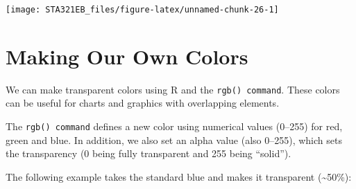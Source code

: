 \documentclass[
]{book}
\newenvironment{Shaded}{\begin{snugshade}}{\end{snugshade}}
\newcommand{\AttributeTok}[1]{\textcolor[rgb]{0.13,0.29,0.53}{#1}}
\newcommand{\ConstantTok}[1]{\textcolor[rgb]{0.56,0.35,0.01}{#1}}
\newcommand{\DecValTok}[1]{\textcolor[rgb]{0.00,0.00,0.81}{#1}}
\newcommand{\DocumentationTok}[1]{\textcolor[rgb]{0.56,0.35,0.01}{\textbf{\textit{#1}}}}
\newcommand{\FloatTok}[1]{\textcolor[rgb]{0.00,0.00,0.81}{#1}}
\newcommand{\FunctionTok}[1]{\textcolor[rgb]{0.13,0.29,0.53}{\textbf{#1}}}
\newcommand{\NormalTok}[1]{#1}
\newcommand{\SpecialCharTok}[1]{\textcolor[rgb]{0.81,0.36,0.00}{\textbf{#1}}}
\newcommand{\StringTok}[1]{\textcolor[rgb]{0.31,0.60,0.02}{#1}}
\begin{document}
\begin{Shaded}
\end{Shaded}

\begin{center}\texttt{[image: STA321EB\_files/figure-latex/unnamed-chunk-26-1]} \end{center}

\hypertarget{making-our-own-colors}{%
\section{Making Our Own Colors}\label{making-our-own-colors}}

We can make transparent colors using R and the \texttt{rgb()\ command}. These colors can be useful for charts and graphics with overlapping elements.

The \texttt{rgb()\ command} defines a new color using numerical values (0--255) for red, green and blue. In addition, we also set an alpha value (also 0--255), which sets the transparency (0 being fully transparent and 255 being ``solid'').

The following example takes the standard blue and makes it transparent (\textasciitilde50\%):
\end{document}
